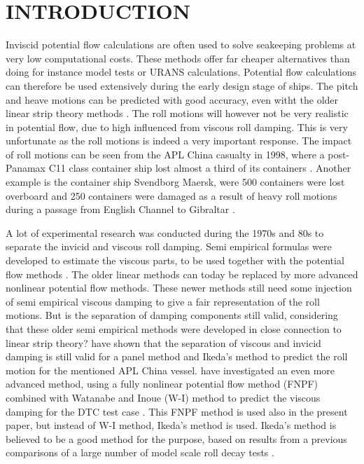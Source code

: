 \section*{INTRODUCTION}\label{introduction}

Inviscid potential flow calculations are often used to solve seakeeping
problems at very low computational costs. These methods offer far
cheaper alternatives than doing for instance model tests or URANS
calculations. Potential flow calculations can therefore be used
extensively during the early design stage of ships. The pitch and heave
motions can be predicted with good accuracy, even witht the older linear
strip theory methods \citep{7505983/FB64RGPF}. The roll motions will
however not be very realistic in potential flow, due to high influenced
from viscous roll damping. This is very unfortunate as the roll motions
is indeed a very important response. The impact of roll motions can be
seen from the APL China casualty in 1998, where a post-Panamax C11 class
container ship lost almost a third of its containers
\citep{7505983/WPADAQB3}. Another example is the container ship Svendborg
Maersk, were 500 containers were lost overboard and 250 containers were
damaged as a result of heavy roll motions during a passage from English
Channel to Gibraltar \citep{7505983/T78CMTDR}.

\quad A lot of experimental research was conducted during the 1970s and
80s to separate the invicid and viscous roll damping. Semi empirical
formulas were developed to estimate the viscous parts, to be used
together with the potential flow methods \citep{7505983/937PN5DT}. The
older linear methods can today be replaced by more advanced nonlinear
potential flow methods. These newer methods still need some injection of
semi empirical viscous damping to give a fair representation of the roll
motions. But is the separation of damping components still valid,
considering that these older semi empirical methods were developed in
close connection to linear strip theory? \citep{7505983/UGK6YEVD} have
shown that the separation of viscous and invicid damping is still valid
for a panel method and Ikeda's method to predict the roll motion for the
mentioned APL China vessel. \citep{7505983/24TNAV5Z} have investigated an
even more advanced method, using a fully nonlinear potential flow method
(FNPF) \citep{7505983/P4XDUMMQ} combined with Watanabe and Inoue (W-I)
method \citep{7505983/ARMIRMVY} to predict the viscous damping for the
DTC test case \citep{7505983/BYNJ8CFG}. This FNPF method is used also in
the present paper, but instead of W-I method, Ikeda's method is used.
Ikeda's method is believed to be a good method for the purpose, based on
results from a previous comparisons of a large number of model scale
roll decay tests \citep{7505983/QMGQ76Q9}.

